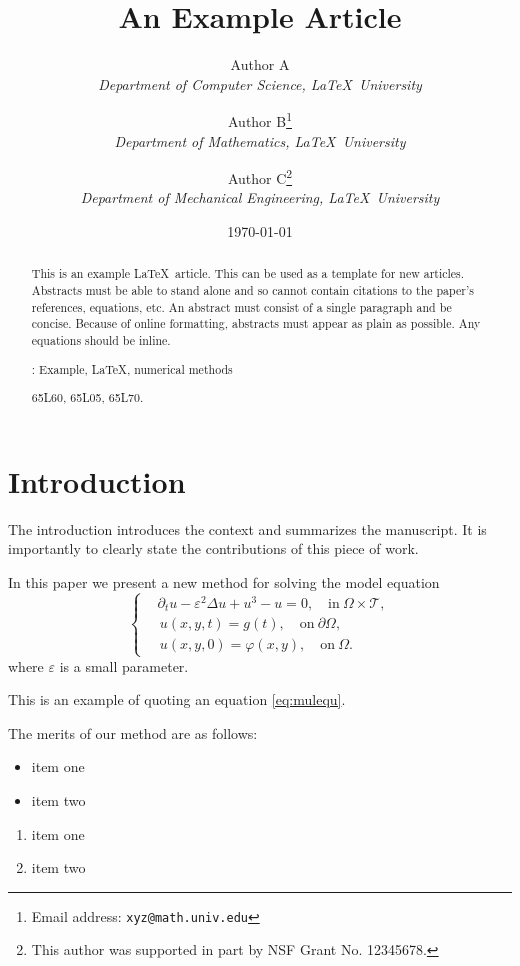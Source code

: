 \documentclass[10pt,reqno,final]{article}
\title{An Example Article}
\author{
  Author A \\
  {\itshape Department of Computer Science, \LaTeX\ University} \\
  \and
  Author B\thanks{Email address: \texttt{xyz@math.univ.edu}} \\
  {\itshape Department of Mathematics, \LaTeX\ University} \\
  \and
  Author C\thanks{This author was supported in part by NSF Grant No. 12345678.} \\
  {\itshape Department of Mechanical Engineering, \LaTeX\ University} \\
}
\date{\today}
\theoremstyle{plain}
\theoremstyle{definition}
\theoremstyle{remark}
\numberwithin{equation}{section}
\numberwithin{figure}{section}
\numberwithin{table}{section}
\begin{document}
\maketitle

\begin{abstract}
  This is an example \LaTeX\ article. This can be used as a
  template for new articles.  Abstracts must be able to stand alone
  and so cannot contain citations to the paper's references,
  equations, etc.  An abstract must consist of a single paragraph and
  be concise. Because of online formatting, abstracts must appear as
  plain as possible. Any equations should be inline.

  \medskip
  : Example, \LaTeX, numerical methods

  \medskip
   65L60, 65L05, 65L70.
\end{abstract}


\section{Introduction}
The introduction introduces the context and summarizes the
manuscript. It is importantly to clearly state the contributions of
this piece of work.

In this paper we present a new method for solving the model equation
\begin{equation}\label{eq:mulequ}
\left\{\begin{aligned}
  & \partial_{t} u-\varepsilon^{2} \Delta u+u^{3}-u=0, \quad \text{in} ~\Omega\times\mathcal{T}, \\
  &\, u(x,y,t) = g(t), \quad \text{on} ~ \partial \Omega, \\
  &\, u(x,y,0)=\varphi(x, y), \quad \text{on} ~\Omega.
\end{aligned}\right.
\end{equation}
where $\varepsilon$ is a small parameter.

This is an example of quoting an equation \eqref{eq:mulequ}.

The merits of our method are as follows:
\begin{itemize}
  \item item one
  \item item two
\end{itemize}
\begin{enumerate}
  \item item one
  \item item two
\end{enumerate}
\end{document}
